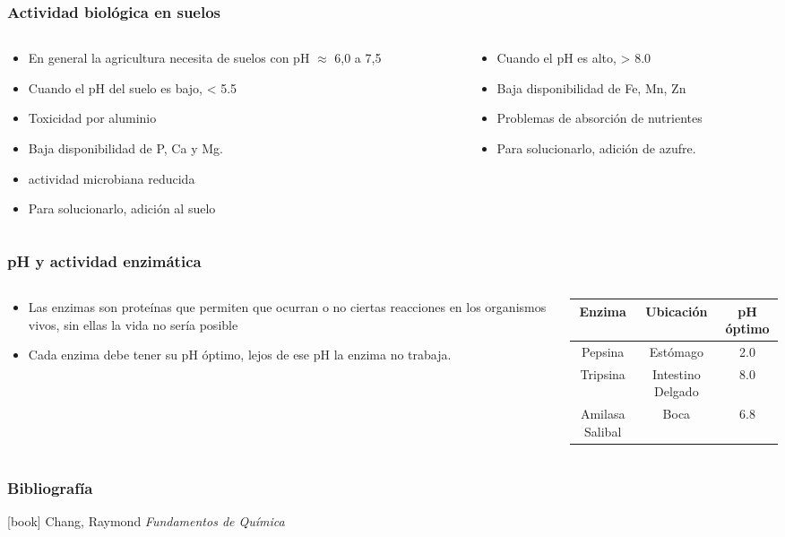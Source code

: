 \documentclass[11pt, aspectratio=169, xcolor=table]{beamer}
\begin{document}
\begin{frame}
  \frametitle{Actividad biológica en suelos}
  \begin{columns}
    \begin{column}{0.5\textwidth}
      \begin{itemize}
        \item En general la agricultura necesita de suelos con pH $\approx$ 6,0 a 7,5 
        \item Cuando el pH del suelo es bajo, < 5.5
        \item Toxicidad por aluminio
        \item Baja disponibilidad de P, Ca y Mg.
        \item actividad microbiana reducida
        \item Para solucionarlo, adición  al suelo
      \end{itemize}
    \end{column}
    \begin{column}{0.5\textwidth}
      \begin{itemize}
        \item Cuando el pH es alto, > 8.0
        \item Baja disponibilidad de Fe, Mn, Zn
        \item Problemas de absorción de nutrientes
        \item Para solucionarlo, adición de azufre.
      \end{itemize}
    \end{column}
  \end{columns}
\end{frame}

\begin{frame}
  \frametitle{pH y actividad enzimática}
  \begin{columns}
    \begin{column}{0.4\textwidth}
      \begin{itemize}
        \item Las enzimas son proteínas que permiten que ocurran o no ciertas reacciones en los organismos vivos, sin ellas la vida no sería posible
        \item Cada enzima debe tener su pH óptimo, lejos de ese pH la enzima no trabaja.
      \end{itemize}
    \end{column}
    \begin{column}{0.6\textwidth}
      \begin{tabular}{|c|c|c|} \hline
        Enzima & Ubicación & pH óptimo \\ \hline
        Pepsina & Estómago & 2.0 \\
        Tripsina  & Intestino Delgado & 8.0 \\
        Amilasa Salibal & Boca & 6.8 \\ \hline
      \end{tabular}
    \end{column}
  \end{columns}
\end{frame}


\begin{frame}
  \frametitle{Bibliografía}
  \begin{thebibliography}{99}
    [book]
    Chang, Raymond
    \newblock \emph{Fundamentos de Química}
  \end{thebibliography}
\end{frame}
\end{document}
